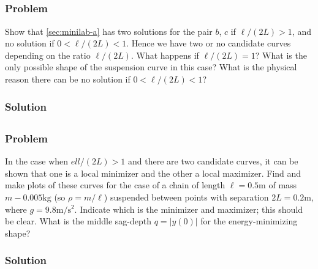 \documentclass[12pt,twoside]{article}
\begin{document}
\subsection{}
\subsubsection*{Problem}
Show that \cref{sec:minilab-a} has two solutions for the pair $b$, $c$ if
$\ell/(2L)>1$, and no solution if $0<\ell/(2L)<1$. Hence we have two or no
candidate curves depending on the ratio $\ell/(2L)$. What happens if
$\ell/(2L)=1$? What is the only possible shape of the suspension curve in this
case? What is the physical reason there can be no solution if $0<\ell/(2L)<1$?

\subsubsection*{Solution}
\todo{}

\subsection{}
\subsubsection*{Problem}
In the case when $ell/(2L)>1$ and there are two candidate curves, it can be
shown that one is a local minimizer and the other a local maximizer. Find and
make plots of these curves for the case of a chain of length $\ell=0.5\text{m}$
of mass $m-0.005\text{kg}$ (so $\rho=m/\ell$) suspended between points with
separation $2L=0.2\text{m}$, where $g=9.8\text{m/s$^2$}$. Indicate which is the
minimizer and maximizer; this should be clear. What is the middle sag-depth
$q=|y(0)|$ for the energy-minimizing shape?

\subsubsection*{Solution}
\todo{}
\end{document}
